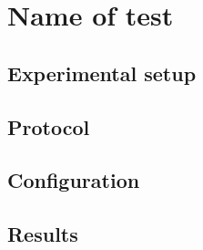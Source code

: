 \section{Name of test}
\label{sec:Label}



\subsection{Experimental setup}


\subsection{Protocol}


\subsection{Configuration}


\subsection{Results}